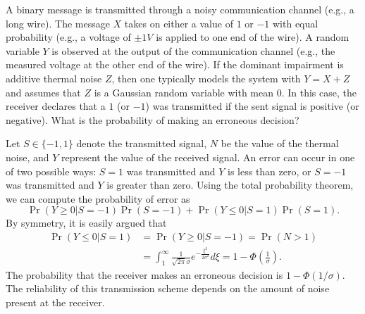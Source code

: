 \begin{example} \label{example:NoiseCommunicationSystem1}
A binary message is transmitted through a noisy communication channel (e.g., a long wire).
The message $X$ takes on either a value of $1$ or $-1$ with equal probability (e.g., a voltage of $\pm 1 V$ is applied to one end of the wire).
A random variable $Y$ is observed at the output of the communication channel (e.g., the measured voltage at the other end of the wire).
If the dominant impairment is additive thermal noise $Z$, then one typically models the system with $Y = X + Z$ and assumes that $Z$ is a Gaussian random variable with mean 0.
In this case, the receiver declares that a $1$ (or $-1$) was transmitted if the sent signal is positive (or negative).
What is the probability of making an erroneous decision?

Let $S \in \{ -1, 1 \}$ denote the transmitted signal, $N$ be the value of the thermal noise, and $Y$ represent the value of the received signal.
An error can occur in one of two possible ways: $S = 1$ was transmitted and $Y$ is less than zero, or $S = -1$ was transmitted and $Y$ is greater than zero.
Using the total probability theorem, we can compute the probability of error as
\begin{equation*}
\Pr (Y \geq 0 | S = -1) \Pr (S = -1)
+ \Pr (Y \leq 0 | S = 1) \Pr (S = 1).
\end{equation*}
By symmetry, it is easily argued that
\begin{equation*}
\begin{split}
\Pr (Y \leq 0 | S = 1) &= \Pr (Y \geq 0 | S = -1) = \Pr (N > 1) \\
&= \int_{1}^{\infty} \frac{1}{\sqrt{2 \pi} \sigma}
e^{- \frac{\xi^2}{2 \sigma^2}} d\xi
= 1 - \Phi \left( \frac{1}{\sigma} \right) .
\end{split}
\end{equation*}
The probability that the receiver makes an erroneous decision is $1 - \Phi (1/\sigma)$.
The reliability of this transmission scheme depends on the amount of noise present at the receiver.
\end{example}


